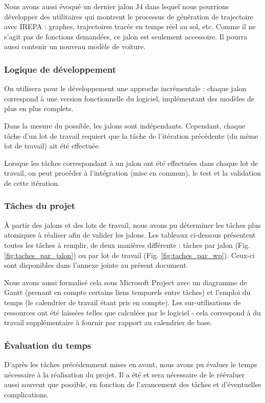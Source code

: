 \documentclass[a4paper,12pt]{report}
\begin{document}
	Nous avons aussi évoqué un dernier jalon \textsf{J4} dans lequel nous pourrions développer des utilitaires qui montrent le processus de génération de trajectoire avec IREPA : graphes, trajectoires tracée en temps réel au sol, etc. Comme il ne s'agit pas de fonctions demandées, ce jalon est seulement accessoire. Il pourra aussi contenir un nouveau modèle de voiture.


\subsubsection{Logique de développement}
On utilisera pour le développement une approche incrémentale : chaque jalon correspond à une version fonctionnelle du logiciel, implémentant des modèles de plus en plus complets.

Dans la mesure du possible, les jalons sont indépendants. Cependant, chaque tâche d’un lot de travail requiert que la tâche de l’itération précédente (du même lot de travail) ait été effectuée.

Lorsque les tâches correspondant à un jalon ont été effectuées dans chaque lot de travail, on peut procéder à l’intégration (mise en commun), le test et la validation de cette itération.

\subsubsection{Tâches du projet}
À partir des jalons et des lots de travail, nous avons pu déterminer les tâches plus atomiques à réaliser afin de valider les jalons. Les tableaux ci-dessous présentent toutes les tâches à remplir, de deux manières différente : tâches par jalon (Fig. \ref{fig:taches_par_jalon}) ou par lot de travail (Fig. \ref{fig:taches_par_wp}). Ceux-ci sont disponibles dans l'annexe jointe au présent document.

Nous avons aussi formalisé cela sous Microsoft Project avec un diagramme de Gantt (prenant en compte certains liens temporels entre tâches) et l'emploi du temps (le calendrier de travail étant pris en compte). Les sur-utilisations de ressources ont été laissées telles que calculées par le logiciel - cela correspond à du travail supplémentaire à fournir par rapport au calendrier de base.



\subsubsection{Évaluation du temps}
D'après les tâches précédemment mises en avant, nous avons pu évaluer le temps nécessaire à la réalisation du projet. Il a été et sera nécessaire de le réévaluer aussi souvent que possible, en fonction de l'avancement des tâches et d'éventuelles complications.
\end{document}
